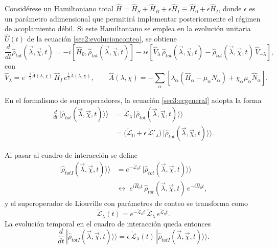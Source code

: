 Considérese un Hamiltoniano total 
\(\hat{H} = \hat{H}_{S} + \hat{H}_{B} + \epsilon \hat{H}_{I} \equiv \hat{H}_{0} + \epsilon \hat{H}_{I}\),
donde \(\epsilon\) es un parámetro adimensional que permitirá implementar posteriormente el régimen de acoplamiento débil. Si este Hamiltoniano se emplea en la evolución unitaria \(\hat{U}(t)\) de la ecuación \eqref{sec2:evolucionconteo}, se obtiene
\begin{equation}
    \frac{d}{dt}\hat{\rho}_{tot}(\vec{\lambda},\vec{\chi},t) 
    = -i[\hat{H}_{0},\hat{\rho}_{tot}(\vec{\lambda},\vec{\chi},t)]
      - i\epsilon\!\left[\hat{V}_{\lambda}\,\hat{\rho}_{tot}(\vec{\lambda},\vec{\chi},t)
      - \hat{\rho}_{tot}(\vec{\lambda},\vec{\chi},t)\,\hat{V}_{-\lambda}\right],
    \label{sec3:ecgeneral}
\end{equation}
con
\begin{equation*}
    \hat{V}_{\lambda} 
    = e^{-\frac{i}{2}\hat{A}(\lambda,\chi)}\,\hat{H}_{I}\,e^{\frac{i}{2}\hat{A}(\lambda,\chi)},
    \qquad 
    \hat{A}(\lambda,\chi) 
    = -\sum_{\alpha}\!\left[\lambda_{\alpha}(\hat{H}_{\alpha}-\mu_{\alpha}\hat{N}_{\alpha})
      + \chi_{\alpha}\mu_{\alpha}\hat{N}_{\alpha}\right].
\end{equation*}

En el formalismo de superoperadores, la ecuación \eqref{sec3:ecgeneral} adopta la forma
\begin{align*}
    \frac{d}{dt}\,|\hat{\rho}_{tot}(\vec{\lambda},\vec{\chi},t)\rangle\rangle
    &= \check{\mathcal{L}}_{\lambda}\,|\hat{\rho}_{tot}(\vec{\lambda},\vec{\chi},t)\rangle\rangle \\
    &= \big(\check{\mathcal{L}}_{0} + \epsilon\,\check{\mathcal{L}}'_{\lambda}\big)\,
       |\hat{\rho}_{tot}(\vec{\lambda},\vec{\chi},t)\rangle\rangle .
\end{align*}

Al pasar al cuadro de interacción se define
\begin{align*}
    |\hat{\rho}_{totI}(\vec{\lambda},\vec{\chi},t)\rangle\rangle 
    &= e^{-\check{\mathcal{L}}_{0}t}\,|\hat{\rho}_{tot}(\vec{\lambda},\vec{\chi},t)\rangle\rangle \\
    &\longleftrightarrow\;
       e^{i\hat{H}_{0}t}\,\hat{\rho}_{tot}(\vec{\lambda},\vec{\chi},t)\,e^{-i\hat{H}_{0}t},
\end{align*}
y el superoperador de Liouville con parámetros de conteo se transforma como
\begin{equation*}
    \check{\mathcal{L}}_{\lambda}(t)
    = e^{-\check{\mathcal{L}}_{0}t}\,\check{\mathcal{L}}_{\lambda}\,e^{\check{\mathcal{L}}_{0}t}.
\end{equation*}
La evolución temporal en el cuadro de interacción queda entonces
\begin{equation}
    \frac{d}{dt}\,|\hat{\rho}_{totI}(\vec{\lambda},\vec{\chi},t)\rangle\rangle
    = \epsilon\,\check{\mathcal{L}}_{\lambda}(t)\,|\hat{\rho}_{totI}(\vec{\lambda},\vec{\chi},t)\rangle\rangle .
    \label{sec2FCS:evolution}
\end{equation}

